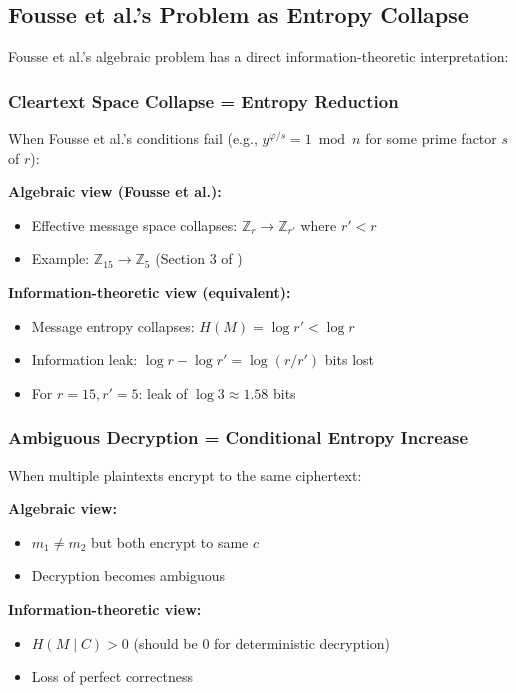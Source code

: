 \documentclass[11pt]{article}
\theoremstyle{definition}
\begin{document}
\subsection{Fousse et al.'s Problem as Entropy Collapse}

Fousse et al.'s algebraic problem has a direct information-theoretic interpretation:

\subsubsection{Cleartext Space Collapse = Entropy Reduction}

When Fousse et al.'s conditions fail (e.g., $y^{\varphi/s} = 1 \bmod n$ for some prime factor $s$ of $r$):

\textbf{Algebraic view (Fousse et al.):}
\begin{itemize}
\item Effective message space collapses: $\mathbb{Z}_r \to \mathbb{Z}_{r'}$ where $r' < r$
\item Example: $\mathbb{Z}_{15} \to \mathbb{Z}_5$ (Section 3 of \cite{fousse2011benaloh})
\end{itemize}

\textbf{Information-theoretic view (equivalent):}
\begin{itemize}
\item Message entropy collapses: $H(M) = \log r' < \log r$
\item Information leak: $\log r - \log r' = \log(r/r')$ bits lost
\item For $r=15, r'=5$: leak of $\log 3 \approx 1.58$ bits
\end{itemize}

\subsubsection{Ambiguous Decryption = Conditional Entropy Increase}

When multiple plaintexts encrypt to the same ciphertext:

\textbf{Algebraic view:}
\begin{itemize}
\item $m_1 \neq m_2$ but both encrypt to same $c$
\item Decryption becomes ambiguous
\end{itemize}

\textbf{Information-theoretic view:}
\begin{itemize}
\item $H(M \mid C) > 0$ (should be 0 for deterministic decryption)
\item Loss of perfect correctness
\end{itemize}
\end{document}

